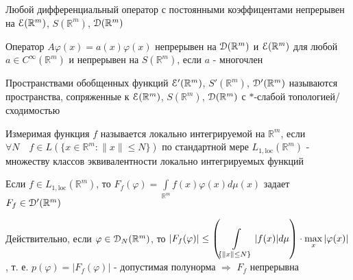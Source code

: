 \documentclass[a4paper,12pt]{report}
\newcommand*{\hm}[1]{#1\nobreak\discretionary{}%
            {\hbox{$\mathsurround=0pt #1$}}{}}
\begin{document}
\begin{cons}
Любой дифференциальный оператор с постоянными коэффицентами непрерывен на $\EuScript E(\mathbb R^m)$, $S(\mathbb R^m)$, $\EuScript D(\mathbb R^m)$
\end{cons}


\begin{rem}
Оператор $A\varphi(x)=a(x)\varphi(x)$ непрерывен на $\EuScript D(\mathbb R^m)$ и $\EuScript E(\mathbb R^m)$ для любой $a\in C^\infty(\mathbb R^m)$ и непрерывен на $S(\mathbb R^m)$, если $a$ - многочлен
\end{rem}


\begin{df}
Пространствами обобщенных функций $\EuScript E'(\mathbb R^m)$, $S'(\mathbb R^m)$, $\EuScript D'(\mathbb R^m)$ называются пространства, сопряженные к $\EuScript E(\mathbb R^m)$, $S(\mathbb R^m)$, $\EuScript D(\mathbb R^m)$ с $*$-слабой топологией/сходимостью
\end{df}


\begin{df}
Измеримая функция $f$ называется локально интегрируемой на $\mathbb R^m$, если $\forall N\quad f\in L(\{x\in\mathbb R^m\colon\|x\|\le N\})$ по стандартной мере $L_{1,\mathrm{loc}}(\mathbb R^m)$ - множеству классов эквивалентности локально интегрируемых функций
\end{df}


\begin{ex}
Если $f\in L_{1,\mathrm{loc}}(\mathbb R^m)$, то $F_f(\varphi)=\displaystyle\int\limits_{\mathbb R^m}f(x)\varphi(x)d\mu(x)$ задает\\ $F_f\in\EuScript D'(\mathbb R^m)$

Действительно, если $\varphi\in\EuScript D_N(\mathbb R^m)$, то $|F_f(\varphi)|\le\left(\displaystyle\int\limits_{\{\|x\|\le N\}}|f(x)|d\mu\right)\hm\cdot\max\limits_x|\varphi(x)|$, т. е. $p(\varphi)=|F_f(\varphi)|$ - допустимая полунорма $\Rightarrow$ $F_f$ непрерывна
\end{ex}
\end{document}
